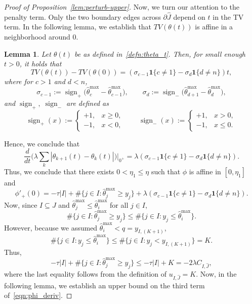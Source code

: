 \documentclass[10pt,a4paper]{amsart}
\newtheorem{lemma}{Lemma}
\newcommand{\one}{\mathbf 1}
\begin{document}
\begin{proof}[Proof of Proposition~\ref{lem:perturb-upper}]
Now, we turn our attention to the penalty term. Only the two boundary edges across $\partial \hat{J}$ depend on $t$ in the TV term. In the following lemma, we establish that $TV(\theta(t))$ is affine in a neighborhood around $0$.
\begin{lemma}\label{lemma:TV_is_affine}
    Let $\theta(t)$ be as defined in~\eqref{defn:theta_t}. Then, for small enough $t>0$, it holds that
    \begin{equation}\label{eqn:penalty_term_is_affine}
    TV(\theta(t))-TV(\theta(0))=(\sigma_{c-1}\one\{c\neq 1\}-\sigma_d\one\{d\neq n\})t,
\end{equation}
where for $c>1$ and $d<n$,
\[
\sigma_{c-1}:=\operatorname{sign}_+\bigl(\hat\theta^{\max}_c-\hat\theta^{\max}_{c-1}\bigr),
\qquad
\sigma_d:=\operatorname{sign}_-\bigl(\hat\theta^{\max}_{d+1}-\hat\theta^{\max}_d\bigr),
\]
and $\operatorname{sign}_+,\;\operatorname{sign}_-$ are defined as
\[
\operatorname{sign}_+(x):=
\begin{cases}
+1,& x\ge 0,\\
-1,& x<0,
\end{cases}
\qquad
\operatorname{sign}_-(x):=
\begin{cases}
+1,& x>0,\\
-1,& x\le 0.
\end{cases}
\]
\end{lemma}
Hence, we conclude that
\[\frac{d}{dt}\Big(\lambda\sum_{k}|\theta_{k+1}(t)-\theta_k(t)|\Big)\Big|_{0^+}
=
\lambda(\sigma_{c-1}\one\{c\neq 1\}-\sigma_d\one\{d\neq n\}).\]
Thus, we conclude that there exists $0<\eta_1\leq \eta$ such that $\phi$ is affine in $[0,\eta_1]$ and 
\begin{equation}\label{eqn:phi_deriv}
    \phi'_+(0)=-\tau|I|+\#\{j\in I:\hat\theta^{\max}_j\ge y_j\}+\lambda(\sigma_{c-1}\one\{c\neq 1\}-\sigma_d\one\{d\neq n\}).
\end{equation}
Now, since $I\subseteq J$ and $\hat\theta^{\max}_j\le\hat\theta^{\max}_i$ for all $j\in I$,
\[
\#\{j\in I:\hat\theta^{\max}_j\ge y_j\}
\le
\#\{j\in I:y_j\le \hat\theta_i^{\max}\}.
\]
However, because we assumed $\hat\theta_i^{\max}<q=y_{I,(K+1)}$,
\[
\#\{j\in I:y_j\le \hat\theta_i^{\max}\}\le \#\{j\in I:y_j< y_{I,(K+1)}\}= K.
\]
Thus,
\begin{equation}\label{eq:data-bound-full}
-\tau|I|
+\#\{j\in I:\hat\theta^{\max}_j\ge y_j\}
\leq
-\tau|I|+K
=
-2\lambda C_{I,\hat{J}},
\end{equation}
where the last equality follows from the definition of $u_{I,\hat{J}}=K.$
Now, in the following lemma, we establish an upper bound on the third term of~\eqref{eqn:phi_deriv}.

\end{proof}
\end{document}

